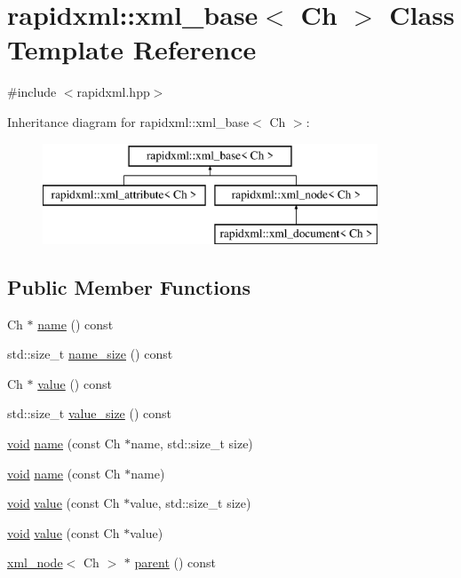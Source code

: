 \hypertarget{classrapidxml_1_1xml__base}{}\section{rapidxml\+:\+:xml\+\_\+base$<$ Ch $>$ Class Template Reference}
\label{classrapidxml_1_1xml__base}


{\ttfamily \#include $<$rapidxml.\+hpp$>$}

Inheritance diagram for rapidxml\+:\+:xml\+\_\+base$<$ Ch $>$\+:\begin{figure}[H]
\begin{center}
\leavevmode
\includegraphics[height=3.000000cm]{classrapidxml_1_1xml__base}
\end{center}
\end{figure}
\subsection*{Public Member Functions}
\begin{DoxyCompactItemize}
\item 
Ch $\ast$ \hyperlink{classrapidxml_1_1xml__base_a9a09739310469995db078ebd0da3ed45}{name} () const 
\item 
std\+::size\+\_\+t \hyperlink{classrapidxml_1_1xml__base_a7e7f98b3d01e1eab8dc1ca69aad9af84}{name\+\_\+size} () const 
\item 
Ch $\ast$ \hyperlink{classrapidxml_1_1xml__base_adcdaccff61c665f039d9344e447b7445}{value} () const 
\item 
std\+::size\+\_\+t \hyperlink{classrapidxml_1_1xml__base_a9fcf201ed0915ac18dd43b0b5dcfaf32}{value\+\_\+size} () const 
\item 
\hyperlink{_s_d_l__audio_8h_a52835ae37c4bb905b903cbaf5d04b05f}{void} \hyperlink{classrapidxml_1_1xml__base_ae55060ae958c6e6465d6c8db852ec6ce}{name} (const Ch $\ast$name, std\+::size\+\_\+t size)
\item 
\hyperlink{_s_d_l__audio_8h_a52835ae37c4bb905b903cbaf5d04b05f}{void} \hyperlink{classrapidxml_1_1xml__base_a4611ddc82ac83a527c65606600eb2a0d}{name} (const Ch $\ast$name)
\item 
\hyperlink{_s_d_l__audio_8h_a52835ae37c4bb905b903cbaf5d04b05f}{void} \hyperlink{classrapidxml_1_1xml__base_a3b183c2db7022a6d30494dd2f0ac11e9}{value} (const Ch $\ast$value, std\+::size\+\_\+t size)
\item 
\hyperlink{_s_d_l__audio_8h_a52835ae37c4bb905b903cbaf5d04b05f}{void} \hyperlink{classrapidxml_1_1xml__base_a81e63ec4bfd2d7ef0a6c2ed49be6e623}{value} (const Ch $\ast$value)
\item 
\hyperlink{classrapidxml_1_1xml__node}{xml\+\_\+node}$<$ Ch $>$ $\ast$ \hyperlink{classrapidxml_1_1xml__base_a7f31ae930f93852830234db1ae59c4c4}{parent} () const 
\end{DoxyCompactItemize}
